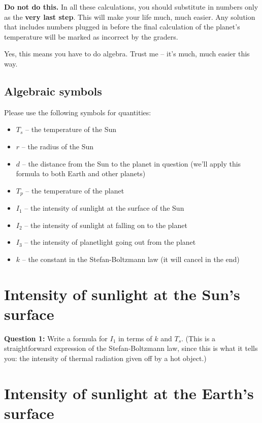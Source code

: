 \documentclass[11pt]{article}
\def\BI{\begin{itemize}}
\def\EI{\end{itemize}}
\begin{document}
{\bf Do not do this.} In all these calculations, you should substitute in numbers only as the {\bf very last step}. This will make your life much, much easier. Any solution that includes
numbers plugged in before the final calculation of the planet's temperature will be marked as incorrect by the graders. 

Yes, this means you have to do algebra. Trust me -- it's much, much easier this way.

\subsection*{Algebraic symbols}

Please use the following symbols for quantities:

\BI
\item $T_s$ -- the temperature of the Sun
\item $r$ -- the radius of the Sun
\item $d$ -- the distance from the Sun to the planet in question (we'll apply this formula to both Earth and other planets)
\item $T_p$ -- the temperature of the planet
\item $I_1$ -- the intensity of sunlight at the surface of the Sun
\item $I_2$ -- the intensity of sunlight at falling on to the planet
\item $I_3$ -- the intensity of planetlight going out from the planet
\item $k$ -- the constant in the Stefan-Boltzmann law (it will cancel in the end)
\EI

\section*{Intensity of sunlight at the Sun's surface}

{\bf Question 1:} Write a formula for $I_1$ in terms of $k$ and $T_s$. (This is a straightforward expression of the Stefan-Boltzmann law, since this is what it tells you: the intensity of thermal radiation
given off by a hot object.)

\vspace*{2cm}

\hrulefill

\section*{Intensity of sunlight at the Earth's surface}
\end{document}
